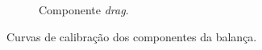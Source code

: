 \begin{figure}[htbp]
\begin{subfigure}{\textwidth}
        \caption{Componente \textit{drag}.}\label{fig:calibration_FD}
    \end{subfigure}
    \caption{Curvas de calibração dos componentes da balança.}\label{fig:calibration_curves}
\end{figure}

